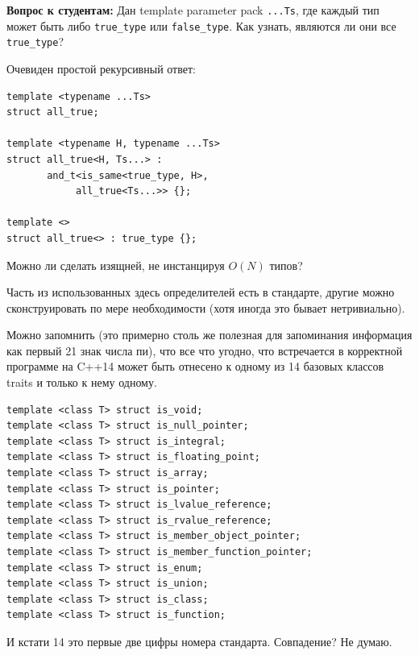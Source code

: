 \documentclass[a4paper,12pt,oneside]{article}
\newif\ifanswers
\begin{document}
\textbf{Вопрос к студентам:} Дан template parameter pack \lstinline!...Ts!, где каждый тип может быть либо \lstinline!true_type! или \lstinline!false_type!. Как узнать, являются ли они все \lstinline!true_type!?

Очевиден простой рекурсивный ответ:

\begin{lstlisting}
template <typename ...Ts>
struct all_true;

template <typename H, typename ...Ts>
struct all_true<H, Ts...> : 
       and_t<is_same<true_type, H>, 
            all_true<Ts...>> {};

template <>
struct all_true<> : true_type {};
\end{lstlisting}

Можно ли сделать изящней, не инстанцируя $O(N)$ типов?

\ifanswers
Более просветляющий ответ использует кортежи:

\begin{lstlisting}
template <typename H, typename ...Ts>
struct all_true<H, Ts...> : 
       and_t<is_same<true_type, H>, 
             is_same<tuple<H,Ts...>,
                     tuple<Ts...,H>>> {};
\end{lstlisting}
\fi

Часть из использованных здесь определителей есть в стандарте, другие можно сконструировать по мере необходимости (хотя иногда это бывает нетривиально).

Можно запомнить (это примерно столь же полезная для запоминания информация как первый 21 знак числа пи), что все что угодно, что встречается в корректной программе на C++14 может быть отнесено к одному из 14 базовых классов traits и только к нему одному. 

\begin{lstlisting}
template <class T> struct is_void;
template <class T> struct is_null_pointer;
template <class T> struct is_integral;
template <class T> struct is_floating_point;
template <class T> struct is_array;
template <class T> struct is_pointer;
template <class T> struct is_lvalue_reference;
template <class T> struct is_rvalue_reference;
template <class T> struct is_member_object_pointer;
template <class T> struct is_member_function_pointer;
template <class T> struct is_enum;
template <class T> struct is_union;
template <class T> struct is_class;
template <class T> struct is_function;
\end{lstlisting}

И кстати 14 это первые две цифры номера стандарта. Совпадение? Не думаю.
\end{document}
